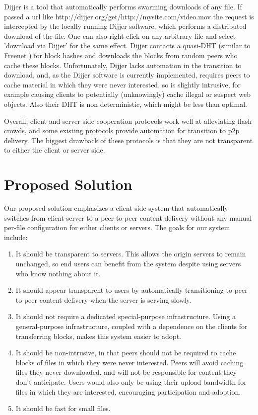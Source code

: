 
Dijjer \cite{dijjer} is a tool that automatically performs swarming downloads of any file.  If passed a url like http://dijjer.org/get/http://mysite.com/video.mov 
the request is intercepted by the locally running Dijjer software, which performs a distributed download of the file.  
One can also right-click on any arbitrary file and select 'download via Dijjer' for the same effect.  
Dijjer contacts a quasi-DHT (similar to Freenet \cite{freenet}) for block hashes and downloads the blocks from random peers who cache 
these blocks.  Unfortunately, Dijjer lacks automation in the transition to download, and, 
as the Dijjer software is currently implemented, requires peers to cache material in which they were never interested, so is slightly intrusive, 
for example causing clients to potentially (unknowingly) cache illegal or suspect web objects.  
Also their DHT is non deterministic, which might be less than optimal.

Overall, client and server side cooperation protocols work well at alleviating flash crowds, 
and some existing protocols provide automation for transition to p2p delivery.  
The biggest drawback of these protocols is that they are not transparent to either the client or server side.

\section {Proposed Solution}\label{section:solution}
Our proposed solution emphasizes a client-side system that automatically switches from client-server to a peer-to-peer content delivery without any manual per-file 
configuration for either clients or servers.  The goals for our system include:
\begin{enumerate}
\item It should be transparent to servers.  This allows the origin servers to remain unchanged, 
so end users can benefit from the system despite using servers who know nothing about it.
\item It should appear transparent to users by automatically transitioning to peer-to-peer content delivery when the server is serving slowly.
\item It should not require a dedicated special-purpose infrastructure.  Using a general-purpose infrastructure, coupled with a dependence on the clients 
for transferring blocks, makes this system easier to adopt.
\item It should be non-intrusive, in that peers should not be 
required to cache blocks of files in which they were never interested.  Peers will avoid caching files they never downloaded, and will not be responsible for 
content they don't anticipate.  Users would also only be using their upload bandwidth for files in which they are interested, encouraging participation and adoption.
\item It should be fast for small files.
\end{enumerate}
